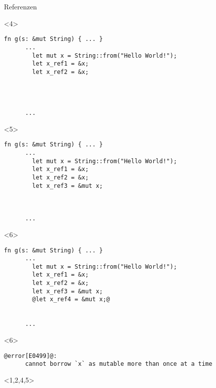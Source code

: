 \begin{frame}[fragile]{Referenzen}

  \begin{onlyenv}<4> {
    \begin{lstlisting}[frame=single,style=base]
      fn g(s: &mut String) { ... }
      ...
        let mut x = String::from("Hello World!");
        let x_ref1 = &x;
        let x_ref2 = &x;




      ...\end{lstlisting}
  }
  \end{onlyenv}


  \begin{onlyenv}<5> {
    \begin{lstlisting}[frame=single,style=base]
      fn g(s: &mut String) { ... }
      ...
        let mut x = String::from("Hello World!");
        let x_ref1 = &x;
        let x_ref2 = &x;
        let x_ref3 = &mut x;



      ...\end{lstlisting}
  }
  \end{onlyenv}


  \begin{onlyenv}<6> {
    \begin{lstlisting}[frame=single,style=base]
      fn g(s: &mut String) { ... }
      ...
        let mut x = String::from("Hello World!");
        let x_ref1 = &x;
        let x_ref2 = &x;
        let x_ref3 = &mut x;
        @let x_ref4 = &mut x;@


      ...\end{lstlisting}
  }
  \end{onlyenv}

  \begin{onlyenv}<6> {
    \begin{lstlisting}[frame=single,style=base]
      @error[E0499]@:
      cannot borrow `x` as mutable more than once at a time\end{lstlisting}
  }
  \end{onlyenv}


  \begin{onlyenv}<1,2,4,5> {
    \begin{lstlisting}[frame=single,style=base]

    \end{lstlisting}
  }
  \end{onlyenv}

\end{frame}